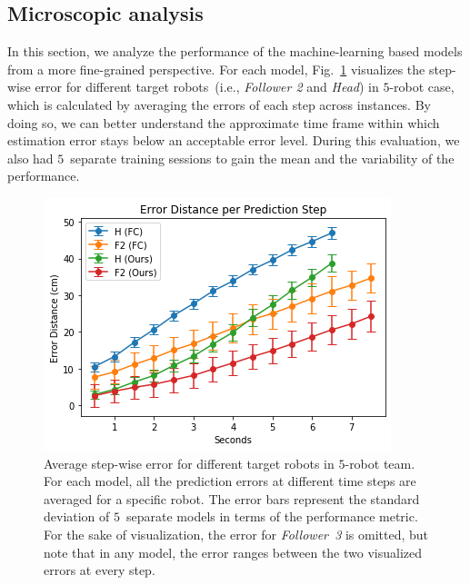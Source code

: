 \documentclass[letterpaper, 10 pt, conference]{ieeeconf}  %
\begin{document}
	\subsection{Microscopic analysis}
	\label{sec:microscopic_analysis}

    In this section, we analyze the performance of the machine-learning
    based models from a more fine-grained perspective. For each model,
    Fig.~\ref{fig:micro_eval} visualizes the step-wise error for
    different target robots~(i.e., \emph{Follower 2} and \emph{Head}) in
    $5$-robot case, which is calculated by averaging the errors of each
    step across instances. By doing so, we can better understand the
    approximate time frame within which estimation error stays below an
    acceptable error level. During this evaluation, we also had
    $5$~separate training sessions to gain the mean and the variability
    of the performance.
	\begin{figure}[t]
		\centering
		\includegraphics[width=1.\columnwidth]{fig_micro_eval}
		\caption{Average step-wise error for different target robots in $5$-robot team.
			For each model, all the prediction errors at different time steps are averaged
			for a specific robot. The error bars represent the standard deviation of
			$5$~separate models in terms of the performance metric. For the sake of
			visualization, the error for \emph{Follower~3} is omitted, but note that
			in any model, the error ranges between the two visualized errors at every step.
		}
		\label{fig:micro_eval}
	\end{figure}
\end{document}
